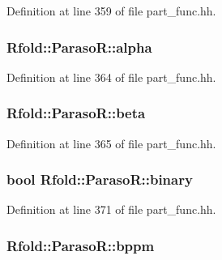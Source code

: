 Definition at line 359 of file part\+\_\+func.\+hh.

\hypertarget{class_rfold_1_1_paraso_r_a9f5a209eb1cd9de0f4f01c23f4f5e111}{
\subsubsection[{alpha}]{ Rfold\+::\+Paraso\+R\+::alpha}}\label{class_rfold_1_1_paraso_r_a9f5a209eb1cd9de0f4f01c23f4f5e111}


Definition at line 364 of file part\+\_\+func.\+hh.

\hypertarget{class_rfold_1_1_paraso_r_a4ebc3071b4f1aa34c75af71d88cf7382}{
\subsubsection[{beta}]{ Rfold\+::\+Paraso\+R\+::beta}}\label{class_rfold_1_1_paraso_r_a4ebc3071b4f1aa34c75af71d88cf7382}


Definition at line 365 of file part\+\_\+func.\+hh.

\hypertarget{class_rfold_1_1_paraso_r_af2bb3eef2ea5d6f92d490f2a36c8ab64}{
\subsubsection[{binary}]{\setlength{\rightskip}{0pt plus 5cm}bool Rfold\+::\+Paraso\+R\+::binary}}\label{class_rfold_1_1_paraso_r_af2bb3eef2ea5d6f92d490f2a36c8ab64}


Definition at line 371 of file part\+\_\+func.\+hh.

\hypertarget{class_rfold_1_1_paraso_r_a0372b87e995aa99226a2e5c0bda44800}{
\subsubsection[{bppm}]{ Rfold\+::\+Paraso\+R\+::bppm}}\label{class_rfold_1_1_paraso_r_a0372b87e995aa99226a2e5c0bda44800}


